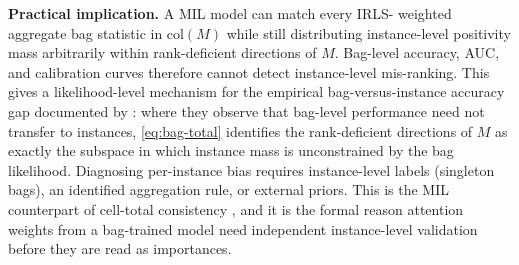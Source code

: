 \textbf{Practical implication.} A MIL model can match every IRLS-
weighted aggregate bag statistic in $\mathrm{col}(M)$ while still
distributing instance-level positivity mass arbitrarily within
rank-deficient directions of $M$. Bag-level accuracy, AUC, and
calibration curves therefore cannot detect instance-level
mis-ranking. This gives a likelihood-level mechanism for the
empirical bag-versus-instance accuracy gap documented by
\citet{vanwinckelen2016instance}: where they observe that bag-level
performance need not transfer to instances, \eqref{eq:bag-total}
identifies the rank-deficient directions of $M$ as exactly the
subspace in which instance mass is unconstrained by the bag
likelihood. Diagnosing per-instance bias requires instance-level
labels (singleton bags), an identified aggregation rule, or
external priors. This is the MIL counterpart of cell-total
consistency \citep{towell2026scrnacoarsening}, and it is the formal
reason attention weights from a bag-trained model need independent
instance-level validation before they are read as importances.
